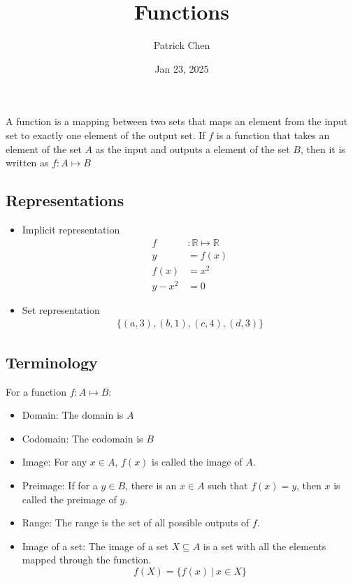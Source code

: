 \documentclass{article}
\title{Functions}
\author{Patrick Chen}
\date{Jan 23, 2025}
\theoremstyle{mytheoremstyle}
\theoremstyle{mytheoremstyle}
\theoremstyle{myproblemstyle}
\begin{document}
    \maketitle
    A function is a mapping between two sets that maps an element from the input
    set to exactly one element of the output set. If $f$ is a function that
    takes an element of the set $A$ as the input and outputs a element of the
    set $B$, then it is written as $f: A\mapsto B$

    \subsection*{Representations}
    \begin{itemize}
        \item Implicit representation
            \begin{align*}
                f&: \mathbb{R} \mapsto \mathbb{R} \\
                y &= f(x) \\
                f(x) &= x^2 \\
                y-x^2 &= 0
            \end{align*}
        \item Set representation
            \begin{align*}
                \{(a,3), (b,1), (c, 4),(d,3)\}
            \end{align*}
    \end{itemize}
    \subsection*{Terminology}
    For a function $f: A \mapsto B$:
    \begin{itemize}
        \item Domain: The domain is $A$
        \item Codomain: The codomain is $B$
        \item Image: For any $x\in A$, $f(x)$ is called the image of $A$.
        \item Preimage: If for a $y\in B$, there is an $x\in A$ such that
            $f(x)=y$, then $x$ is called the preimage of $y$.
        \item Range: The range is the set of all possible outputs of $f$.
        \item Image of a set: The image of a set $X\subseteq A$ is a set with
            all the elements mapped through the function.
            \[
                f(X) = \{ f(x) \ |\ x\in X\}
            \]
    \end{itemize}
\end{document}
